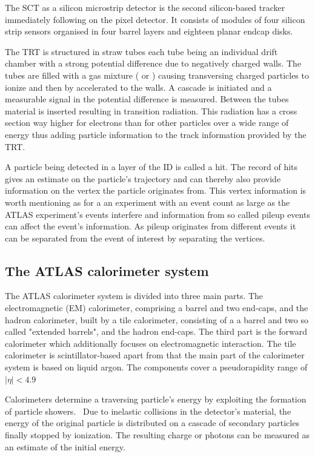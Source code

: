The SCT as a silicon microstrip detector is the second silicon-based tracker immediately following on the pixel detector. It consists of modules of four silicon strip sensors organised in four barrel layers and eighteen planar endcap disks.

The TRT is structured in straw tubes each tube being an individual drift chamber with a strong potential difference due to negatively charged walls. The tubes are filled with a gas mixture ( or ) causing transversing charged particles to ionize and then by accelerated to the walls. A cascade is initiated and a measurable signal in the potential difference is measured. 
Between the tubes material is inserted resulting in transition radiation. This radiation has a cross section way higher for electrons than for other particles over a wide range of energy thus adding particle information to the track information provided by the TRT.

A particle being detected in a layer of the ID is called a hit. The record of hits gives an estimate on the particle's trajectory and can thereby also provide information on the vertex the particle originates from. This vertex information is worth mentioning as for a an experiment with an event count as large as the ATLAS experiment's events interfere and information from so called pileup events can affect the event's information. As pileup originates from different events it can be separated from the event of interest by separating the vertices.

\subsection{The ATLAS calorimeter system}

The ATLAS calorimeter system is divided into three main parts. The electromagnetic (EM) calorimeter, comprising a barrel and two end-caps, and the hadron calorimeter, built by a tile calorimeter, consisting of a a barrel and two so called "extended barrels", and the hadron end-caps. The third part is the forward calorimeter which additionally focuses on electromagnetic interaction. The tile calorimeter is scintillator-based apart from that the main part of the calorimeter system is based on liquid argon. The components cover a pseudorapidity range of $|\eta| < 4.9$

Calorimeters determine a traversing particle's energy by exploiting the formation of particle showers.~\cite{wermes} Due to inelastic collisions in the detector's material, the energy of the original particle is distributed on a cascade of secondary particles finally stopped by ionization. The resulting charge or photons can be measured as an estimate of the initial energy.

